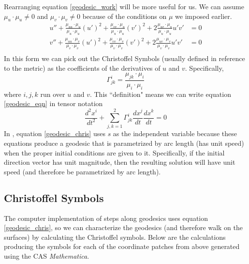 \documentclass[12pt]{article}
\begin{document}
		Rearranging equation \ref{geodesic_work} will be more useful for us. We can assume $\mu_u \cdot \mu_u \neq 0$  and $\mu_v \cdot \mu_v \neq 0$ because of the conditions on $\mu$ we imposed earlier.
		\begin{equation} \label{geodesic_eqn} \begin{split}
			u'' + \frac{\mu_{uu} \cdot \mu_u}{\mu_u \cdot \mu_u} (u')^2 + \frac{\mu_{vv} \cdot \mu_u}{\mu_u \cdot \mu_u} (v')^2 + 2\frac{\mu_{uv} \cdot \mu_u}{\mu_u \cdot \mu_u} u'v' & = 0 \\
			v'' + \frac{\mu_{uu} \cdot \mu_v}{\mu_v \cdot \mu_v} (u')^2 + \frac{\mu_{vv} \cdot \mu_v}{\mu_v \cdot \mu_v} (v')^2 + 2\frac{\mu_{uv} \cdot \mu_v}{\mu_v \cdot \mu_v} u'v' & = 0 \\
		\end{split} \end{equation}
		In this form we can pick out the Christoffel Symbols (usually defined in reference to the metric) as the coefficients of the derivatives of $u$ and $v$. Specifically,
		\begin{equation}
			\Gamma^i_{jk} = \frac{\mu_{jk} \cdot \mu_i}{\mu_i \cdot \mu_i}
		\end{equation}
		where $i,j,k$ run over $u$ and $v$.
		This ``definition" means we can write equation \ref{geodesic_eqn} in tensor notation
		\begin{equation} \label{geodesic_chris}
			\frac{d^2 x^i}{dt^2} + \sum_{j,k = 1}^2 \Gamma^i_{jk} \frac{d x^j}{dt} \frac{dx^k}{dt} = 0
		\end{equation}
		In \cite{BanchoffLovett_DiffGeo_2010}, equation \ref{geodesic_chris} uses $s$ as the independent variable because these equations produce a geodesic that is parametrized by arc length (has unit speed) when the proper initial conditions are given to it.
		Specifically, if the initial direction vector has unit magnitude, then the resulting solution will have unit speed (and therefore be parametrized by arc length).
		
	\subsection{Christoffel Symbols}
		The computer implementation of steps along geodesics uses equation \ref{geodesic_chris}, so we can characterize the geodesics (and therefore walk on the surfaces) by calculating the Christoffel symbols.
		Below are the calculations producing the symbols for each of the coordinate patches from above generated using the CAS \textit{Mathematica}.
		
\end{document}

